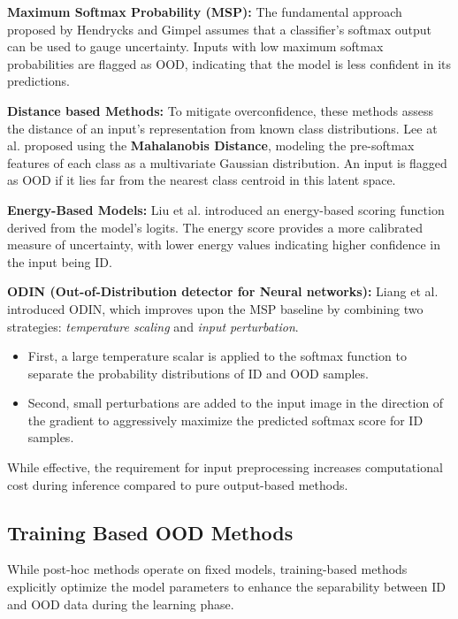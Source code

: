\documentclass[oneside]{ctuthesis}
\begin{document}
\textbf{Maximum Softmax Probability (MSP):} The fundamental approach proposed by Hendrycks and Gimpel\cite{hendrycks2018baselinedetectingmisclassifiedoutofdistribution} assumes that a classifier's softmax output can be used to gauge uncertainty. Inputs with low maximum softmax probabilities are flagged as OOD, indicating that the model is less confident in its predictions.

\textbf{Distance based Methods:} 
To mitigate overconfidence, these methods assess the distance of an input's representation from known class distributions.
Lee at al.\cite{lee2018simpleunifiedframeworkdetecting} proposed using the \textbf{Mahalanobis Distance}, modeling the pre-softmax features of each class as a multivariate Gaussian distribution. An input is flagged as OOD if it lies far from the nearest class centroid in this latent space.

\textbf{Energy-Based Models:} Liu et al.\cite{liu2021energybasedoutofdistributiondetection} introduced an energy-based scoring function derived from the model's logits. The energy score provides a more calibrated measure of uncertainty, with lower energy values indicating higher confidence in the input being ID.

\textbf{ODIN (Out-of-Distribution detector for Neural networks):} Liang et al.\cite{liang2020enhancingreliabilityoutofdistributionimage} introduced ODIN, which improves upon the MSP baseline by combining two strategies: \textit{temperature scaling} and \textit{input perturbation}.
\begin{itemize}
    \item First, a large temperature scalar is applied to the softmax function to separate the probability distributions of ID and OOD samples.
    \item Second, small perturbations are added to the input image in the direction of the gradient to aggressively maximize the predicted softmax score for ID samples.
\end{itemize}
While effective, the requirement for input preprocessing increases computational cost during inference compared to pure output-based methods.

\subsection{Training Based OOD Methods}
\label{sec:rel_trainingbased}
While post-hoc methods operate on fixed models, training-based methods explicitly optimize the model parameters to enhance the separability between ID and OOD data during the learning phase.
\end{document}
